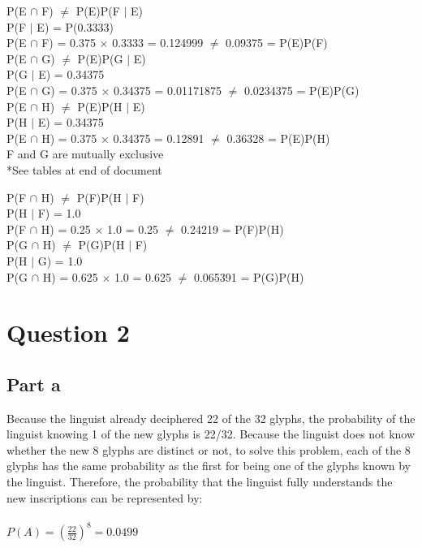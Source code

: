 \documentclass[11pt]{article}
\begin{document}
\noindent
P(E $\cap$ F) $ \neq $ P(E)P(F $\mid$ E)\\
P(F $\mid$ E) = P(0.3333)\\
P(E $\cap$ F) = 0.375 $\times$ 0.3333 = 0.124999 $ \neq $ 0.09375 = P(E)P(F)\\

\noindent
P(E $\cap$ G) $ \neq $ P(E)P(G $\mid$ E)\\
P(G $\mid$ E) = 0.34375\\
P(E $\cap$ G) = 0.375 $\times$ 0.34375 = 0.01171875 $ \neq $ 0.0234375 = P(E)P(G)\\

\noindent
P(E $\cap$ H) $ \neq $ P(E)P(H $\mid$ E)\\
P(H $\mid$ E) = 0.34375\\
P(E $\cap$ H) = 0.375 $\times$ 0.34375 = 0.12891 $ \neq $ 0.36328 = P(E)P(H)\\

\noindent
F and G are mutually exclusive\\
\noindent
*See tables at end of document

\noindent
P(F $\cap$ H) $ \neq $ P(F)P(H $\mid$ F)\\
P(H $\mid$ F) = 1.0\\
P(F $\cap$ H) = 0.25 $\times$ 1.0 = 0.25 $ \neq $ 0.24219 = P(F)P(H)\\

\noindent
P(G $\cap$ H) $ \neq $ P(G)P(H $\mid$ F)\\
P(H $\mid$ G) = 1.0\\
P(G $\cap$ H) = 0.625 $\times$ 1.0 = 0.625 $ \neq $ 0.065391 = P(G)P(H)\\

\section*{Question 2}

\subsection*{Part a}
\noindent
Because the linguist already deciphered 22 of the 32 glyphs, the probability of the linguist knowing 1 of the new glyphs is 22/32. Because the linguist does not know whether the new 8 glyphs are distinct or not, to solve this problem, each of the 8 glyphs has the same probability as the first for being one of the glyphs known by the linguist. Therefore, the probability that the linguist fully understands the new inscriptions can be represented by:\\\\
$ P(A) = ( \frac{22}{32} )^{8} = 0.0499 $
\end{document}
